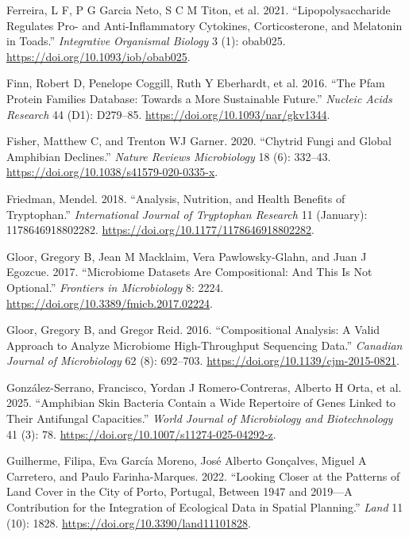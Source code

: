 \documentclass[
  12pt,
]{article}
\newlength{\cslhangindent}
\newenvironment{CSLReferences}[2] %
 {\begin{list}{}{%
  \setlength{\itemindent}{0pt}
  \setlength{\leftmargin}{0pt}
  \setlength{\parsep}{0pt}
  \ifodd #1
   \setlength{\leftmargin}{\cslhangindent}
   \setlength{\itemindent}{-1\cslhangindent}
  \fi
  \setlength{\itemsep}{#2\baselineskip}}}
 {\end{list}}
\begin{document}
\begin{CSLReferences}{1}{1}
Ferreira, L F, P G Garcia Neto, S C M Titon, et al. 2021.
{``Lipopolysaccharide {Regulates} {Pro}- and {Anti}-{Inflammatory}
{Cytokines}, {Corticosterone}, and {Melatonin} in {Toads}.''}
\emph{Integrative Organismal Biology} 3 (1): obab025.
\url{https://doi.org/10.1093/iob/obab025}.

{Finn, Robert D, Penelope Coggill, Ruth Y Eberhardt, et al.} 2016.
{``The {Pfam} Protein Families Database: Towards a More Sustainable
Future.''} \emph{Nucleic Acids Research} 44 (D1): D279--85.
\url{https://doi.org/10.1093/nar/gkv1344}.

Fisher, Matthew C, and Trenton WJ Garner. 2020. {``Chytrid Fungi and
Global Amphibian Declines.''} \emph{Nature Reviews Microbiology} 18 (6):
332--43. \url{https://doi.org/10.1038/s41579-020-0335-x}.

Friedman, Mendel. 2018. {``Analysis, {Nutrition}, and {Health}
{Benefits} of {Tryptophan}.''} \emph{International Journal of Tryptophan
Research} 11 (January): 1178646918802282.
\url{https://doi.org/10.1177/1178646918802282}.

Gloor, Gregory B, Jean M Macklaim, Vera Pawlowsky-Glahn, and Juan J
Egozcue. 2017. {``Microbiome Datasets Are Compositional: And This Is Not
Optional.''} \emph{Frontiers in Microbiology} 8: 2224.
\url{https://doi.org/10.3389/fmicb.2017.02224}.

Gloor, Gregory B, and Gregor Reid. 2016. {``Compositional Analysis: A
Valid Approach to Analyze Microbiome High-Throughput Sequencing Data.''}
\emph{Canadian Journal of Microbiology} 62 (8): 692--703.
\url{https://doi.org/10.1139/cjm-2015-0821}.

{González-Serrano, Francisco, Yordan J Romero-Contreras, Alberto H Orta,
et al.} 2025. {``Amphibian Skin Bacteria Contain a Wide Repertoire of
Genes Linked to Their Antifungal Capacities.''} \emph{World Journal of
Microbiology and Biotechnology} 41 (3): 78.
\url{https://doi.org/10.1007/s11274-025-04292-z}.

Guilherme, Filipa, Eva García Moreno, José Alberto Gonçalves, Miguel A
Carretero, and Paulo Farinha-Marques. 2022. {``Looking Closer at the
Patterns of Land Cover in the {City} of {Porto}, {Portugal}, Between
1947 and 2019---{A} Contribution for the Integration of Ecological Data
in Spatial Planning.''} \emph{Land} 11 (10): 1828.
\url{https://doi.org/10.3390/land11101828}.


\end{CSLReferences}
\end{document}
